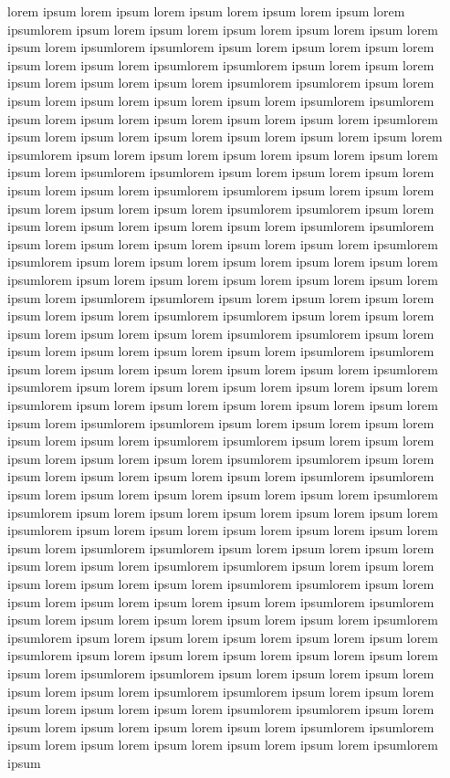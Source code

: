 lorem ipsum lorem ipsum lorem ipsum lorem ipsum lorem ipsum lorem ipsumlorem ipsum lorem ipsum lorem ipsum lorem ipsum lorem ipsum lorem ipsum lorem ipsumlorem ipsumlorem ipsum lorem ipsum lorem ipsum lorem ipsum lorem ipsum lorem ipsumlorem ipsumlorem ipsum lorem ipsum lorem ipsum lorem ipsum lorem ipsum lorem ipsumlorem ipsumlorem ipsum lorem ipsum lorem ipsum lorem ipsum lorem ipsum lorem ipsumlorem ipsumlorem ipsum lorem ipsum lorem ipsum lorem ipsum lorem ipsum lorem ipsumlorem ipsum lorem ipsum lorem ipsum lorem ipsum lorem ipsum lorem ipsum lorem ipsumlorem ipsum lorem ipsum lorem ipsum lorem ipsum lorem ipsum lorem ipsum lorem ipsumlorem ipsumlorem ipsum lorem ipsum lorem ipsum lorem ipsum lorem ipsum lorem ipsumlorem ipsumlorem ipsum lorem ipsum lorem ipsum lorem ipsum lorem ipsum lorem ipsumlorem ipsumlorem ipsum lorem ipsum lorem ipsum lorem ipsum lorem ipsum lorem ipsumlorem ipsumlorem ipsum lorem ipsum lorem ipsum lorem ipsum lorem ipsum lorem ipsumlorem ipsumlorem ipsum lorem ipsum lorem ipsum lorem ipsum lorem ipsum lorem ipsumlorem ipsum lorem ipsum lorem ipsum lorem ipsum lorem ipsum lorem ipsum lorem ipsumlorem ipsumlorem ipsum lorem ipsum lorem ipsum lorem ipsum lorem ipsum lorem ipsumlorem ipsumlorem ipsum lorem ipsum lorem ipsum lorem ipsum lorem ipsum lorem ipsumlorem ipsumlorem ipsum lorem ipsum lorem ipsum lorem ipsum lorem ipsum lorem ipsumlorem ipsumlorem ipsum lorem ipsum lorem ipsum lorem ipsum lorem ipsum lorem ipsumlorem ipsumlorem ipsum lorem ipsum lorem ipsum lorem ipsum lorem ipsum lorem ipsumlorem ipsum lorem ipsum lorem ipsum lorem ipsum lorem ipsum lorem ipsum lorem ipsumlorem ipsumlorem ipsum lorem ipsum lorem ipsum lorem ipsum lorem ipsum lorem ipsumlorem ipsumlorem ipsum lorem ipsum lorem ipsum lorem ipsum lorem ipsum lorem ipsumlorem ipsumlorem ipsum lorem ipsum lorem ipsum lorem ipsum lorem ipsum lorem ipsumlorem ipsumlorem ipsum lorem ipsum lorem ipsum lorem ipsum lorem ipsum lorem ipsumlorem ipsumlorem ipsum lorem ipsum lorem ipsum lorem ipsum lorem ipsum lorem ipsumlorem ipsum lorem ipsum lorem ipsum lorem ipsum lorem ipsum lorem ipsum lorem ipsumlorem ipsumlorem ipsum lorem ipsum lorem ipsum lorem ipsum lorem ipsum lorem ipsumlorem ipsumlorem ipsum lorem ipsum lorem ipsum lorem ipsum lorem ipsum lorem ipsumlorem ipsumlorem ipsum lorem ipsum lorem ipsum lorem ipsum lorem ipsum lorem ipsumlorem ipsumlorem ipsum lorem ipsum lorem ipsum lorem ipsum lorem ipsum lorem ipsumlorem ipsumlorem ipsum lorem ipsum lorem ipsum lorem ipsum lorem ipsum lorem ipsumlorem ipsum lorem ipsum lorem ipsum lorem ipsum lorem ipsum lorem ipsum lorem ipsumlorem ipsumlorem ipsum lorem ipsum lorem ipsum lorem ipsum lorem ipsum lorem ipsumlorem ipsumlorem ipsum lorem ipsum lorem ipsum lorem ipsum lorem ipsum lorem ipsumlorem ipsumlorem ipsum lorem ipsum lorem ipsum lorem ipsum lorem ipsum lorem ipsumlorem ipsumlorem ipsum lorem ipsum lorem ipsum lorem ipsum lorem ipsum lorem ipsumlorem ipsum

